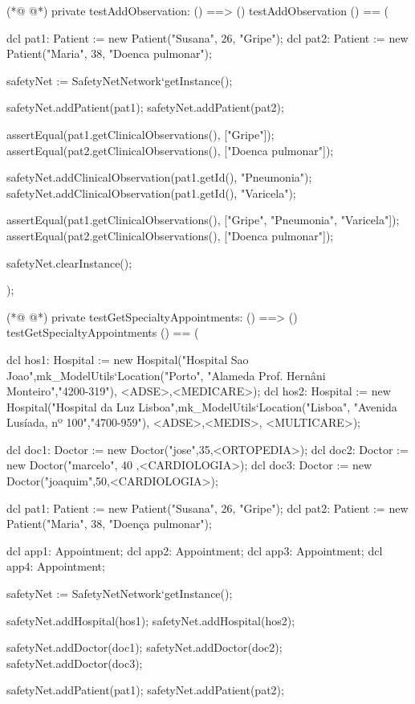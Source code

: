\begin{vdmpp}[breaklines=true]
(*@
\label{testAddObservation:825}
@*)
private testAddObservation: () ==> ()
 testAddObservation () == (
  
  dcl pat1: Patient := new Patient("Susana", 26, "Gripe");
  dcl pat2: Patient := new Patient("Maria", 38, "Doenca pulmonar");
  
  safetyNet := SafetyNetNetwork`getInstance();
   
  safetyNet.addPatient(pat1);
  safetyNet.addPatient(pat2);

  assertEqual(pat1.getClinicalObservations(), ["Gripe"]);
  assertEqual(pat2.getClinicalObservations(), ["Doenca pulmonar"]);
  
  safetyNet.addClinicalObservation(pat1.getId(), "Pneumonia");
  safetyNet.addClinicalObservation(pat1.getId(), "Varicela");

  assertEqual(pat1.getClinicalObservations(), ["Gripe", "Pneumonia", "Varicela"]);
  assertEqual(pat2.getClinicalObservations(), ["Doenca pulmonar"]); 
   
  safetyNet.clearInstance();
    
);


(*@
\label{testGetSpecialtyAppointments:850}
@*)
private testGetSpecialtyAppointments: () ==> ()
 testGetSpecialtyAppointments () == (
 
  dcl hos1: Hospital := new Hospital("Hospital Sao Joao",mk_ModelUtils`Location("Porto", "Alameda Prof. Hernâni Monteiro","4200-319"), {<ADSE>,<MEDICARE>});
  dcl hos2: Hospital := new Hospital("Hospital da Luz Lisboa",mk_ModelUtils`Location("Lisboa", "Avenida Lusíada, nº 100","4700-959"), {<ADSE>,<MEDIS>, <MULTICARE>});
  
  dcl doc1: Doctor := new Doctor("jose",35,<ORTOPEDIA>);
  dcl doc2: Doctor := new Doctor("marcelo", 40 ,<CARDIOLOGIA>);
  dcl doc3: Doctor := new Doctor("joaquim",50,<CARDIOLOGIA>);
  
  dcl pat1: Patient := new Patient("Susana", 26, "Gripe");
  dcl pat2: Patient := new Patient("Maria", 38, "Doença pulmonar");
  
  dcl app1: Appointment;
  dcl app2: Appointment;
  dcl app3: Appointment;
  dcl app4: Appointment;
  
  safetyNet := SafetyNetNetwork`getInstance();
   
  safetyNet.addHospital(hos1);
  safetyNet.addHospital(hos2);
  
  safetyNet.addDoctor(doc1);
  safetyNet.addDoctor(doc2);
  safetyNet.addDoctor(doc3);
  
  safetyNet.addPatient(pat1);
  safetyNet.addPatient(pat2);


\end{vdmpp}

